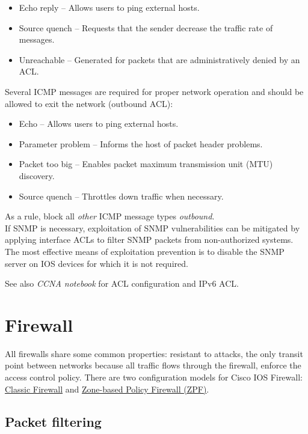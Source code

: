 \begin{itemize}
\item Echo reply -- Allows users to ping external hosts.
\item Source quench -- Requests that the sender decrease the traffic rate of messages.
\item Unreachable -- Generated for packets that are administratively denied by an ACL.
\end{itemize}

Several ICMP messages are required for proper network operation and should be allowed to exit the network (outbound ACL):

\begin{itemize}
\item Echo -- Allows users to ping external hosts.
\item Parameter problem -- Informs the host of packet header problems.
\item Packet too big -- Enables packet maximum transmission unit (MTU) discovery.
\item Source quench -- Throttles down traffic when necessary.
\end{itemize}

As a rule, block all \emph{other} ICMP message types \emph{outbound}.\\

If SNMP is necessary, exploitation of SNMP vulnerabilities can be mitigated by applying interface ACLs to filter SNMP packets from non-authorized systems.  The most effective means of exploitation prevention is to disable the SNMP server on IOS devices for which it is not required. 

\note See also \emph{CCNA notebook} for ACL configuration and IPv6 ACL.

\section{Firewall}

All firewalls share some common properties: resistant to attacks, the only transit point between networks because all traffic flows through the firewall, enforce the access control policy. There are two configuration models for Cisco IOS Firewall: \hyperref[sec:ClassicFirewall]{Classic Firewall} and \hyperref[sec:ZPF]{Zone-based Policy Firewall (ZPF)}.\\

\subsection{Packet filtering}

